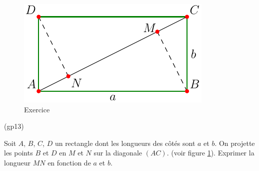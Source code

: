 \begin{figure}[h!]
  \centering
  \includegraphics{Egp13_1.pdf}
  \caption{Exercice }
  \label{fig:Egp13_1}
\end{figure}

\begin{tiny}(gp13)\end{tiny} Soit $A$, $B$, $C$, $D$  un rectangle dont les longueurs des côtés sont $a$ et $b$. On projette les points $B$ et $D$ en $M$ et $N$ sur la diagonale $(AC)$. (voir figure \ref{fig:Egp13_1}).\newline
Exprimer la longueur $MN$ en fonction de $a$ et $b$.
